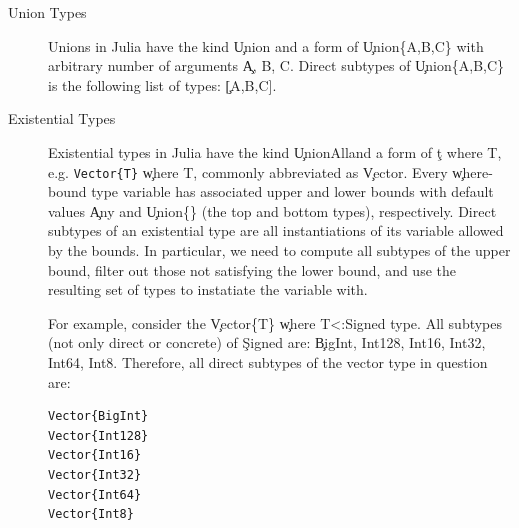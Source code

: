 %


\begin{description}

  \item[Union Types]
        Unions in Julia have the kind \c{Union} and a form of \c{Union\{A,B,C\}}
        with arbitrary number of arguments \c{A, B, C}.
        Direct subtypes of \c{Union\{A,B,C\}} is the following list of types: \c{[A,B,C]}.

  \item[Existential Types]
        Existential types in Julia have the kind \c{UnionAll}\!\!and a form of
        \c{t where T}, e.g. \lstinline|Vector{T}| \c{where T}, commonly abbreviated as \c{Vector}. Every
        \c{where}-bound type variable has associated upper and lower bounds with
        default values \c{Any} and \c{Union\{\}} (the top and bottom types),
        respectively. Direct subtypes of an existential type are all
        instantiations of its variable allowed by the bounds. In particular, we
        need to compute all subtypes of the upper bound, filter out those not
        satisfying the lower bound, and use the resulting set of types to
        instatiate the variable with.

        For example, consider the \c{Vector\{T\}} \c{where T<:Signed} type.
        All subtypes (not only direct or concrete) of \c{Signed} are:
        \c{BigInt, Int128, Int16, Int32, Int64, Int8}. Therefore, all direct
        subtypes of the vector type in question are:

\begin{minipage}{.92\textwidth}
        \begin{lstlisting}
Vector{BigInt}
Vector{Int128}
Vector{Int16}
Vector{Int32}
Vector{Int64}
Vector{Int8}
        \end{lstlisting}
\end{minipage}


\end{description}
